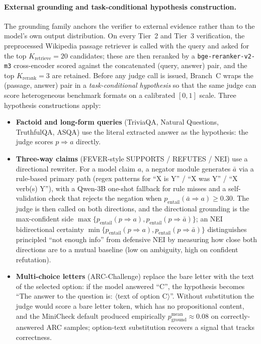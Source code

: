 \paragraph{External grounding and task-conditional hypothesis construction.}
The grounding family anchors the verifier to external evidence rather than to the model's own output distribution. On every Tier~2 and Tier~3 verification, the preprocessed Wikipedia passage retriever is called with the query and asked for the top $K_{\text{retrieve}} = 20$ candidates; these are then reranked by a \texttt{bge-reranker-v2-m3} cross-encoder scored against the concatenated (query, answer) pair, and the top $K_{\text{rerank}} = 3$ are retained. Before any judge call is issued, Branch~C wraps the (passage, answer) pair in a \emph{task-conditional hypothesis} so that the same judge can score heterogeneous benchmark formats on a calibrated $[0,1]$ scale. Three hypothesis constructions apply:
\begin{itemize}
  \item \textbf{Factoid and long-form queries} (TriviaQA, Natural Questions, TruthfulQA, ASQA) use the literal extracted answer as the hypothesis: the judge scores $p \Rightarrow a$ directly.
  \item \textbf{Three-way claims} (FEVER-style SUPPORTS / REFUTES / NEI) use a directional rewriter. For a model claim $a$, a negator module generates $\bar{a}$ via a rule-based primary path (regex patterns for ``X is Y'' / ``X was Y'' / ``X verb(s) Y''), with a Qwen-3B one-shot fallback for rule misses and a self-validation check that rejects the negation when $p_{\text{entail}}(\bar{a} \Rightarrow a) \geq 0.30$. The judge is then called on both directions, and the directional grounding is the max-confident side $\max\{p_{\text{entail}}(p \Rightarrow a), p_{\text{entail}}(p \Rightarrow \bar{a})\}$; an NEI bidirectional certainty $\min\{p_{\text{entail}}(p \Rightarrow a), p_{\text{entail}}(p \Rightarrow \bar{a})\}$ distinguishes principled ``not enough info'' from defensive NEI by measuring how close both directions are to a mutual baseline (low on ambiguity, high on confident refutation).
  \item \textbf{Multi-choice letters} (ARC-Challenge) replace the bare letter with the text of the selected option: if the model answered ``C'', the hypothesis becomes ``The answer to the question is: $\langle$text of option C$\rangle$''. Without substitution the judge would score a bare letter token, which has no propositional content, and the MiniCheck default produced empirically $p_{\text{ground}}^{\text{mean}} \approx 0.08$ on correctly-answered ARC samples; option-text substitution recovers a signal that tracks correctness.
\end{itemize}
